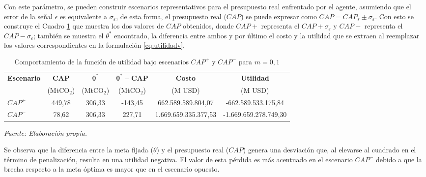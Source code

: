 Con este parámetro, se pueden construir escenarios representativos para el presupuesto real enfrentado por el agente, asumiendo que el error de la señal $\epsilon$ es equivalente a $\sigma_{\varepsilon}$, de esta forma, el presupuesto real ($CAP$) se puede expresar como $CAP = CAP_s \pm \sigma_{\varepsilon}$. Con esto se construye el Cuadro \ref{tab:cap_pos_neg_mm} que muestra los dos valores de $CAP$ obtenidos, donde $CAP+$ representa el $CAP+\sigma_\varepsilon$ y $CAP-$ representa el $CAP-\sigma_\varepsilon$; también se muestra el $\theta^*$ encontrado, la diferencia entre ambos y por último el costo y la utilidad que se extraen al reemplazar los valores correspondientes en la formulación \ref{eq:utilidadv}.

\begin{table}[H]
\centering
\caption{Comportamiento de la función de utilidad bajo escenarios $CAP^{+}$ y $CAP^{-}$ para $m=0,1$}
\label{tab:cap_pos_neg_mm}
\small
\renewcommand{\arraystretch}{1.15}
\setlength{\tabcolsep}{8pt}
\begin{tabular}{l c c c c c}
\toprule
\textbf{Escenario} &
\textbf{CAP} &
$\boldsymbol{\theta^*}$ &
$\boldsymbol{\theta^* - CAP}$ &
\textbf{Costo} &
\textbf{Utilidad} \\
 & (MtCO$_2$) & (MtCO$_2$) & (MtCO$_2$) & (M USD) & (M USD) \\
\midrule
$CAP^{+}$ &
449,78 &
306,33 &
-143,45 &
662.589.589.804,07 &
-662.589.533.175,84 \\

$CAP^{-}$ &
78,62 &
306,33 &
227,71 &
1.669.659.335.377,53 &
-1.669.659.278.749,30 \\
\bottomrule
\end{tabular}

\vspace{0.15cm}
\footnotesize{\textit{Fuente: Elaboración propia.}}
\end{table}
Se observa que la diferencia entre la meta fijada ($\theta$) y el presupuesto real ($CAP$) genera una desviación que, al elevarse al cuadrado en el término de penalización, resulta en una utilidad negativa. El valor de esta pérdida es más acentuado en el escenario $CAP^{-}$ debido a que la brecha respecto a la meta óptima es mayor que en el escenario opuesto.


